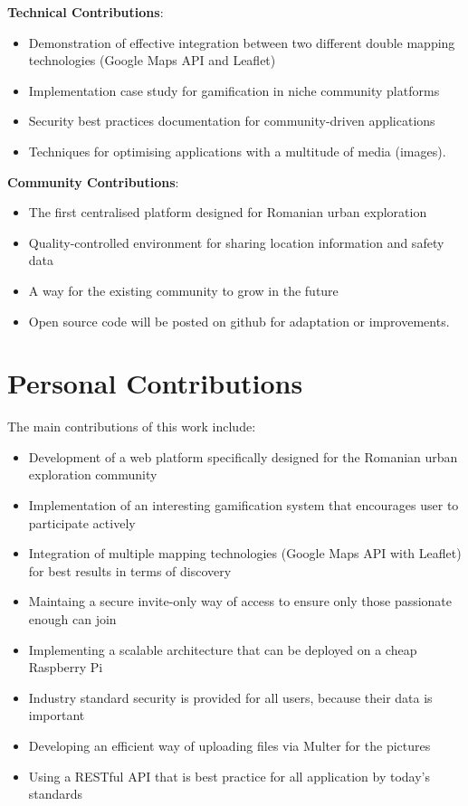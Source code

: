 \documentclass[12pt,a4paper]{report}
\begin{document}
\textbf{Technical Contributions}:
\begin{itemize}
    \item Demonstration of effective integration between two different double mapping technologies (Google Maps API and Leaflet)
    \item Implementation case study for gamification in niche community platforms
    \item Security best practices documentation for community-driven applications
    \item Techniques for optimising applications with a multitude of media (images).
\end{itemize}

\textbf{Community Contributions}:
\begin{itemize}
    \item The first centralised platform designed for Romanian urban exploration
    \item Quality-controlled environment for sharing location information and safety data
    \item A way for the existing community to grow in the future
    \item Open source code will be posted on github for adaptation or improvements.
\end{itemize}

\newpage

\chapter*{Personal Contributions}

The main contributions of this work include:

\begin{itemize}
    \item Development of a web platform specifically designed for the Romanian urban exploration community
    \item Implementation of an interesting gamification system that encourages user to participate actively
    \item Integration of multiple mapping technologies (Google Maps API with Leaflet) for best results in terms of discovery
    \item Maintaing a secure invite-only way of access to ensure only those passionate enough can join
    \item Implementing a scalable architecture that can be deployed on a cheap Raspberry Pi
    \item Industry standard security is provided for all users, because their data is important
    \item Developing an efficient way of uploading files via Multer for the pictures
    \item Using a RESTful API that is best practice for all application by today's standards
\end{itemize}
\end{document}
